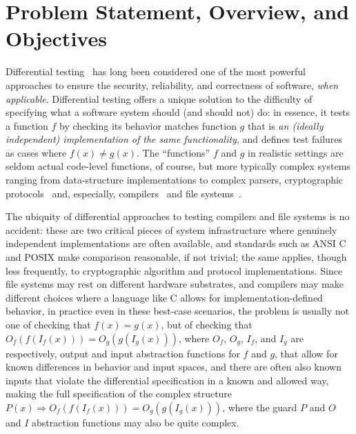 \section{Problem Statement, Overview, and Objectives}

%

Differential testing~\cite{Differential} has long been considered one of the most powerful
approaches to ensure the security, reliability, and correctness of
software, \emph{when applicable}.  Differential testing offers a unique
solution to the difficulty of specifying what a software system should
(and should not) do: in essence, it tests a function $f$ by checking
its behavior matches function $g$ that is \emph{an (ideally independent)
  implementation of the same functionality}, and defines test failures
as cases where $f(x) \neq g(x)$.  The ``functions'' $f$ and $g$ in
realistic settings are seldom actual code-level functions, of course,
but more typically complex systems ranging from data-structure
implementations to complex parsers, cryptographic protocols~\cite{aumasson2017automated} and, especially, compilers~\cite{Differential} and file
systems~\cite{ICSEDiff}.

The ubiquity of differential approaches to testing compilers and file
systems is no accident:  these are two critical pieces of system
infrastructure where genuinely independent implementations are often
available, and standards such as ANSI C and POSIX make comparison
reasonable, if not trivial; the same applies, though less frequently,
to cryptographic algorithm and protocol implementations.  Since file systems may rest on different
hardware substrates, and compilers may make different choices where a
language like C allows for implementation-defined behavior, in practice even
in these best-case scenarios, the problem is usually not one of checking that $f(x)
= g(x)$, but of checking that $O_f(f(I_f(x))) = O_g(g(I_g(x)))$, where
$O_f$, $O_g$, $I_f$, and $I_g$ are respectively, output and input
abstraction functions for $f$ and $g$, that allow for known
differences in behavior and input spaces, and there are often also
known inputs that violate the differential specification in a known
and allowed way, making the full specification of the complex
structure $P(x)
\Rightarrow O_f(f(I_f(x))) = O_g(g(I_g(x)))$, where the guard $P$ and
$O$ and $I$ abstraction functions may also be quite complex.

